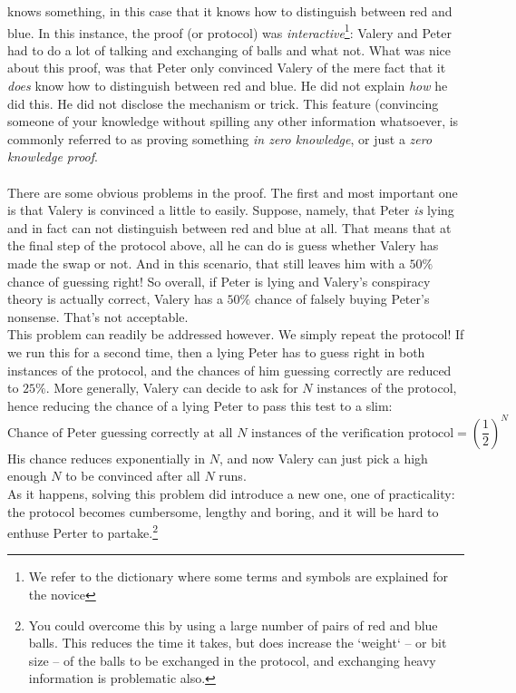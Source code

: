 \documentclass[11pt,oneside]{article}
\theoremstyle{definition}
\theoremstyle{remark}
\numberwithin{equation}{section}
\begin{document}
knows something, in this case that it knows how to distinguish between red and
blue. In this instance, the proof (or protocol) was
\emph{interactive}\footnote{We refer to the dictionary where some terms and
symbols are explained for the novice}: Valery and Peter had to do a lot of
talking and exchanging of balls and what not. What was nice about this proof,
was that Peter only convinced Valery of the mere fact that it \emph{does} know
how to distinguish between red and blue. He did not explain \emph{how} he did
this. He did not disclose the mechanism or trick. This feature (convincing
someone of your knowledge without spilling any other information whatsoever, is
commonly referred to as proving something \emph{in zero knowledge}, or just a
\emph{zero knowledge proof}.\\ \\
There are some obvious problems in the proof. The first and most important
one is that Valery is convinced a little to easily. Suppose, namely, that Peter
\emph{is} lying and in fact can not distinguish between red and blue at all. 
That means that at the final step of the protocol above, all he can do is guess 
whether Valery has made the swap or not. And in this scenario, that still leaves
him with a $50\%$ chance of guessing right! So overall, if Peter is lying and
Valery's conspiracy theory is actually correct, Valery has a $50\%$ chance of
falsely buying Peter's nonsense. That's not acceptable.\\
This problem can readily be addressed however. We simply repeat the protocol! If
we run this for a second time, then a lying Peter has to guess right in both
instances of the protocol, and the chances of him guessing correctly are reduced
to $25\%$. More generally, Valery can decide to ask for $N$ instances of the
protocol, hence reducing the chance of a lying Peter to pass this test to a
slim:
\[\text{Chance of Peter guessing correctly at all $N$ instances of the
verification protocol} = \left(\frac{1}{2}\right)^N \]
His chance reduces exponentially in $N$, and now Valery can just pick a high
enough $N$ to be convinced after all $N$ runs.\\
As it happens, solving this problem did introduce a new one, one of
practicality: the protocol becomes cumbersome, lengthy and boring, and it will
be hard to enthuse Perter to partake.\footnote{You could overcome this by using
a large number of pairs of red and blue balls. This reduces the time it takes,
but does increase the `weight` -- or bit size -- of the balls to be exchanged in
the protocol, and exchanging heavy information is problematic also.}\\
\end{document}
